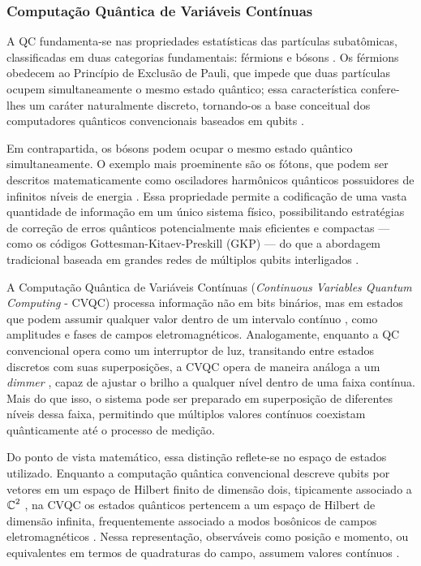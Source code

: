 \subsubsection{Computação Quântica de Variáveis Contínuas}

A QC fundamenta-se nas propriedades estatísticas das partículas 
subatômicas, classificadas em duas categorias fundamentais: férmions e bósons \cite{cohen2019quantum}. Os férmions obedecem ao Princípio de Exclusão de Pauli, que impede que duas partículas ocupem simultaneamente o mesmo estado quântico;  essa característica confere-lhes um caráter naturalmente discreto, tornando-os  a base conceitual dos computadores quânticos convencionais baseados em qubits \cite{sakurai2020modern}.

Em contrapartida, os bósons podem ocupar o mesmo estado quântico simultaneamente.  O exemplo mais proeminente são os fótons, que podem ser descritos matematicamente  como osciladores harmônicos quânticos possuidores de infinitos níveis de energia  \cite{braunstein2005quantum}. Essa propriedade permite a codificação de uma vasta quantidade de informação em um único sistema físico, possibilitando estratégias de correção de erros quânticos potencialmente mais eficientes e compactas — como os códigos Gottesman-Kitaev-Preskill (GKP) — do que a abordagem tradicional baseada em grandes redes de múltiplos qubits interligados \cite{gottesman2000encoding, weedbrook2012gaussian}.

A Computação Quântica de Variáveis Contínuas (\textit{Continuous Variables Quantum Computing} - CVQC) processa informação não em bits binários, mas em estados que podem assumir qualquer valor dentro de um intervalo contínuo \cite{braunstein2005quantum}, como amplitudes e fases de campos eletromagnéticos. Analogamente, enquanto a QC convencional opera como um interruptor de luz, transitando entre estados discretos com suas superposições, a CVQC opera de maneira análoga a um \textit{dimmer} \cite{lloyd1999quantum}, capaz de ajustar o brilho a qualquer nível dentro de uma faixa contínua. Mais do que isso, o sistema pode ser preparado em superposição de diferentes níveis dessa faixa, permitindo que múltiplos valores contínuos coexistam quânticamente até o processo de medição.

Do ponto de vista matemático, essa distinção reflete-se no espaço de estados utilizado. Enquanto a computação quântica convencional descreve qubits por vetores em um espaço de Hilbert finito de dimensão dois, tipicamente associado a $\operatorname{\mathbb{C}}^2$ \cite{nielsen_quantum_2002}, na CVQC os estados quânticos pertencem a um espaço de Hilbert de dimensão infinita, frequentemente associado a modos bosônicos de campos eletromagnéticos \cite{braunstein2005quantum}. Nessa representação, observáveis como posição e momento, ou equivalentes em termos de quadraturas do campo, assumem valores contínuos \cite{lloyd1999quantum,o2007optical}.

